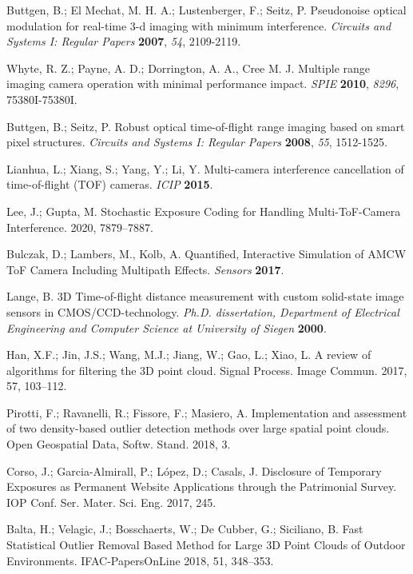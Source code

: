 \begin{thebibliography}{9}
Buttgen, B.; El Mechat, M. H. A.; Lustenberger, F.; Seitz, P. Pseudonoise optical modulation for real-time 3-d imaging with minimum interference. {\em Circuits and Systems I: Regular Papers} {\bf 2007}, {\em 54}, 2109-2119.

Whyte, R. Z.; Payne, A. D.; Dorrington, A. A., Cree M. J. Multiple range imaging camera operation with minimal performance impact. {\em SPIE} {\bf 2010}, {\em 8296}, 75380I-75380I.

Buttgen, B.; Seitz, P. Robust optical time-of-flight range imaging based on smart pixel structures. {\em Circuits and Systems I: Regular Papers} {\bf 2008}, {\em 55}, 1512-1525.

Lianhua, L.; Xiang, S.; Yang, Y.; Li, Y. Multi-camera interference cancellation of time-of-flight (TOF) cameras. {\em ICIP} {\bf 2015}.

Lee, J.; Gupta, M. Stochastic Exposure Coding for Handling Multi-ToF-Camera Interference. 2020, 7879–7887.

Bulczak, D.; Lambers, M., Kolb, A. Quantified, Interactive Simulation of AMCW ToF Camera Including Multipath Effects. {\em Sensors} {\bf 2017}.

Lange, B. 3D Time-of-flight distance measurement with custom solid-state image sensors in CMOS/CCD-technology. {\em Ph.D. dissertation, Department of Electrical Engineering and Computer Science at University of Siegen} {\bf2000}.

Han, X.F.; Jin, J.S.; Wang, M.J.; Jiang, W.; Gao, L.; Xiao, L. A review of algorithms for filtering the 3D point cloud. Signal Process. Image Commun. 2017, 57, 103–112.

Pirotti, F.; Ravanelli, R.; Fissore, F.; Masiero, A. Implementation and assessment of two density-based outlier detection methods over large spatial point clouds. Open Geospatial Data, Softw. Stand. 2018, 3.

Corso, J.; Garcia-Almirall, P.; López, D.; Casals, J. Disclosure of Temporary Exposures as Permanent Website Applications through the Patrimonial Survey. IOP Conf. Ser. Mater. Sci. Eng. 2017, 245.

Balta, H.; Velagic, J.; Bosschaerts, W.; De Cubber, G.; Siciliano, B. Fast Statistical Outlier Removal Based Method for Large 3D Point Clouds of Outdoor Environments. IFAC-PapersOnLine 2018, 51, 348–353.


\end{thebibliography}
